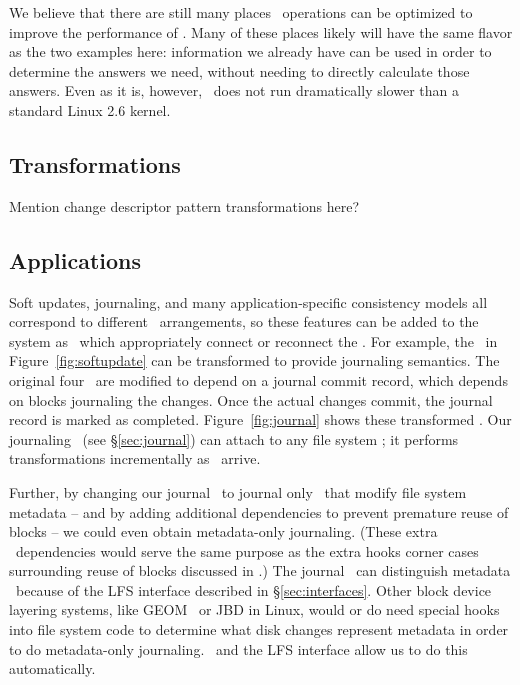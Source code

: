 We believe that there are still many places \chdesc\ operations can be
optimized to improve the performance of \Kudos. Many of these places likely
will have the same flavor as the two examples here: information we already have
can be used in order to determine the answers we need, without needing to
directly calculate those answers. Even as it is, however, \Kudos\ does not run
dramatically slower than a standard Linux 2.6 kernel.

\subsection {Transformations}
Mention change descriptor pattern transformations here?

\subsection {Applications}
Soft updates, journaling, and many application-specific consistency models all
correspond to different \chdesc\ arrangements, so these features can be added to
the system as \modules\ which appropriately connect or reconnect the \chdescs.
For example, the \chdescs\ in Figure~\ref{fig:softupdate} can be transformed to
provide journaling semantics. The original four \chdescs\ are modified to depend
on a journal commit record, which depends on blocks journaling the changes. Once
the actual changes commit, the journal record is marked as completed.
Figure~\ref{fig:journal} shows these transformed \chdescs. Our journaling
\module\ (see \S\ref{sec:journal}) can attach to any file system \module; it
performs transformations incrementally as \chdescs\ arrive.

Further, by changing our journal \module\ to journal only \chdescs\ that modify
file system metadata -- and by adding additional dependencies to prevent
premature reuse of blocks -- we could even obtain metadata-only journaling.
(These extra \chdesc\ dependencies would serve the same purpose as the extra
hooks corner cases surrounding reuse of blocks discussed in
\cite{tweedie00ext3}.) The journal \module\ can distinguish metadata \chdescs\
because of the LFS interface described in \S\ref{sec:interfaces}. Other block
device layering systems, like GEOM~\cite{geom} or JBD in Linux, would or do need
special hooks into file system code to determine what disk changes represent
metadata in order to do metadata-only journaling. \Chdescs\ and the LFS
interface allow us to do this automatically.
